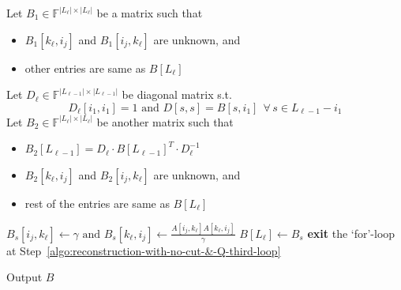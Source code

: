 \documentclass[11pt,letterpaper]{article}
\newcommand{\F}{\mathbb{F}}
\newcommand{\kPME}[3]{\mathrm{PME}(#1, #2, #3)}
\begin{document}
{{{\begin{algorithm}
\begin{algorithmic}[1]
\State Let $B_1\in \F^{|L_\ell|\times |L_\ell|}$ be a matrix such that 
\begin{itemize}[leftmargin=3cm]
\item  $B_1[k_\ell, i_j]$ and $B_1[i_j, k_\ell]$ are unknown, and
\item other entries are same as $B[L_\ell]$
\end{itemize} \label{algo:reconstruction-with-no-cut-&-Q-B1-matrix} 
\State Let $D_\ell\in\F^{|L_{\ell-1}|\times |L_{\ell-1}|}$ be diagonal matrix s.t.
\vspace{0em}
\[D_\ell[i_1, i_1]=1 \text{ and }D[s,s]=B[s,i_1]\ \ \forall\, s\in L_{\ell-1}-i_1\] \label{algo:reconstruction-with-no-cut-&-Q-diagonal-matrix}
\vspace{-1em}
\State  Let $B_2\in \F^{|L_\ell|\times |L_\ell|}$ be another matrix such that
\begin{itemize}[leftmargin=3cm]
\item  $B_2[L_{\ell-1}]=D_\ell\cdot B[L_{\ell-1}]^T\cdot D_\ell^{-1}$
\item  $B_2[k_\ell, i_j]$ and $B_2[i_j, k_\ell]$ are unknown, and
\item  rest of the entries are same as $B[L_\ell]$
\end{itemize} \label{algo:reconstruction-with-no-cut-&-Q-B2-matrix}
\label{algo:reconstruction-with-no-cut-&-Q-third-loop}
\State $B_s[i_j, k_\ell]\leftarrow \gamma \text{ and } B_s[k_\ell, i_j]\leftarrow \frac{A[i_j, k_\ell]A[k_\ell, i_j]}{\gamma}$ 
\If{$\kPME{A[L_\ell]}{B_s[L_\ell]}{4}$ holds} \label{algo:reconstruction-with-no-cut-&-Q-if-condition}
\State $B[L_\ell]\leftarrow B_s$\label{algo:reconstruction-with-no-cut-&-Q-submatrix-constr}
\State \textbf{exit} the `for'-loop at Step~\ref{algo:reconstruction-with-no-cut-&-Q-third-loop}
\EndIf
\EndFor
\EndFor
\EndFor

\State Output $B$
\end{algorithmic}
\end{algorithm}

}}}
\end{document}
